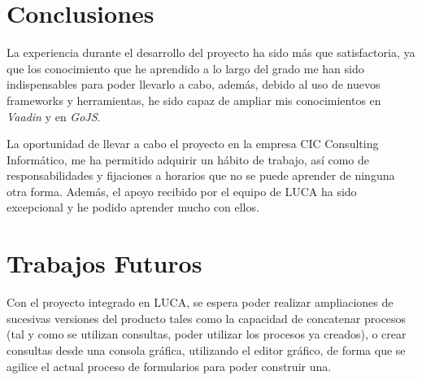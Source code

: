 \section{Conclusiones}

La experiencia durante el desarrollo del proyecto ha sido más que satisfactoria, ya que los conocimiento que he aprendido a lo largo del grado me han sido indispensables para poder llevarlo a cabo, además, debido al uso de nuevos frameworks y herramientas, he sido capaz de ampliar mis conocimientos en \emph{Vaadin} y en \emph{GoJS}.

La oportunidad de llevar a cabo el proyecto en la empresa CIC Consulting Informático, me ha permitido adquirir un hábito de trabajo, así como de responsabilidades y fijaciones a horarios que no se puede aprender de ninguna otra forma. Además, el apoyo recibido por el equipo de LUCA ha sido excepcional y he podido aprender mucho con ellos.

\section{Trabajos Futuros}

Con el proyecto integrado en LUCA, se espera poder realizar ampliaciones de sucesivas versiones del producto tales como la capacidad de concatenar procesos (tal y como se utilizan consultas, poder utilizar los procesos ya creados), o crear consultas desde una consola gráfica, utilizando el editor gráfico, de forma que se agilice el actual proceso de formularios para poder construir una.


	